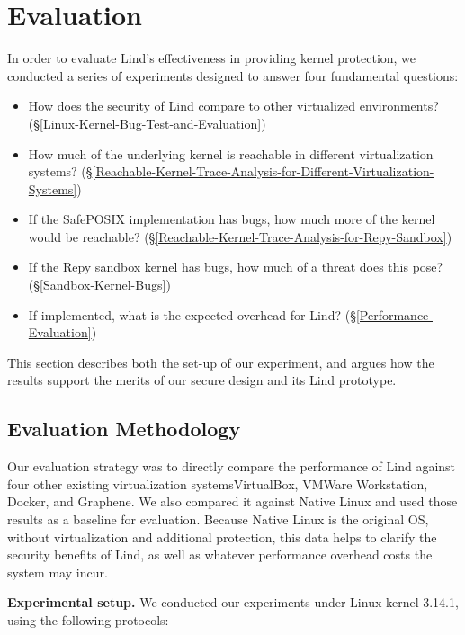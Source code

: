\section{Evaluation}
\label{sec.evaluation}

In order to evaluate Lind's effectiveness in providing kernel protection, we
conducted a series of experiments designed to answer four fundamental questions:

\begin{itemize}
\item How does the security of Lind compare to other virtualized environments?
(\S{\ref{Linux-Kernel-Bug-Test-and-Evaluation}})

\item How much of the underlying kernel is reachable in different
virtualization systems?
(\S{\ref{Reachable-Kernel-Trace-Analysis-for-Different-Virtualization-Systems}})

\item If the SafePOSIX implementation has bugs, how much more of the kernel would be
reachable?
(\S{\ref{Reachable-Kernel-Trace-Analysis-for-Repy-Sandbox}})

\item If the Repy sandbox kernel has bugs, how much of a threat does this pose?
(\S{\ref{Sandbox-Kernel-Bugs}})

\item If implemented, what is the expected overhead for Lind?
(\S{\ref{Performance-Evaluation}})
\end{itemize}

This section describes both the set-up of our experiment, and argues
how the results support the merits of our secure design and its Lind prototype.

\subsection{Evaluation Methodology}

Our evaluation strategy was to directly compare the performance of Lind
against
four other existing virtualization systems\textendash VirtualBox, VMWare
Workstation,
Docker, and Graphene. We also compared it against Native Linux and used
those results as a baseline for evaluation. Because Native Linux is the
original OS,
without virtualization and additional protection, this data helps to
clarify the security benefits of Lind,
as well as whatever performance overhead costs the system may incur.

\textbf{Experimental setup.}
We conducted our experiments under Linux kernel 3.14.1, using the following
protocols:

